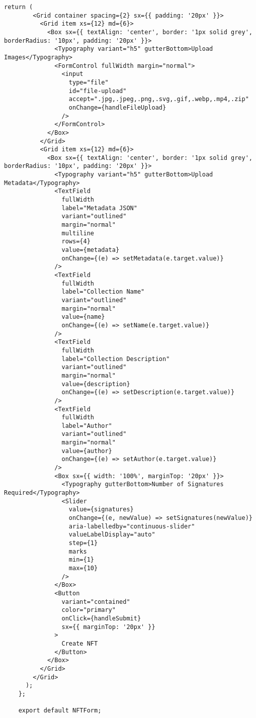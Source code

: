 \begin{lstlisting}[label=lst:admin_webapp, language=React, caption=Интерфейс администратора для создания коллекции дипломов]
      return (
        <Grid container spacing={2} sx={{ padding: '20px' }}>
          <Grid item xs={12} md={6}>
            <Box sx={{ textAlign: 'center', border: '1px solid grey', borderRadius: '10px', padding: '20px' }}>
              <Typography variant="h5" gutterBottom>Upload Images</Typography>
              <FormControl fullWidth margin="normal">
                <input
                  type="file"
                  id="file-upload"
                  accept=".jpg,.jpeg,.png,.svg,.gif,.webp,.mp4,.zip"
                  onChange={handleFileUpload}
                />
              </FormControl>
            </Box>
          </Grid>
          <Grid item xs={12} md={6}>
            <Box sx={{ textAlign: 'center', border: '1px solid grey', borderRadius: '10px', padding: '20px' }}>
              <Typography variant="h5" gutterBottom>Upload Metadata</Typography>
              <TextField
                fullWidth
                label="Metadata JSON"
                variant="outlined"
                margin="normal"
                multiline
                rows={4}
                value={metadata}
                onChange={(e) => setMetadata(e.target.value)}
              />
              <TextField
                fullWidth
                label="Collection Name"
                variant="outlined"
                margin="normal"
                value={name}
                onChange={(e) => setName(e.target.value)}
              />
              <TextField
                fullWidth
                label="Collection Description"
                variant="outlined"
                margin="normal"
                value={description}
                onChange={(e) => setDescription(e.target.value)}
              />
              <TextField
                fullWidth
                label="Author"
                variant="outlined"
                margin="normal"
                value={author}
                onChange={(e) => setAuthor(e.target.value)}
              />
              <Box sx={{ width: '100%', marginTop: '20px' }}>
                <Typography gutterBottom>Number of Signatures Required</Typography>
                <Slider
                  value={signatures}
                  onChange={(e, newValue) => setSignatures(newValue)}
                  aria-labelledby="continuous-slider"
                  valueLabelDisplay="auto"
                  step={1}
                  marks
                  min={1}
                  max={10}
                />
              </Box>
              <Button
                variant="contained"
                color="primary"
                onClick={handleSubmit}
                sx={{ marginTop: '20px' }}
              >
                Create NFT
              </Button>
            </Box>
          </Grid>
        </Grid>
      );
    };
    
    export default NFTForm;
\end{lstlisting}

